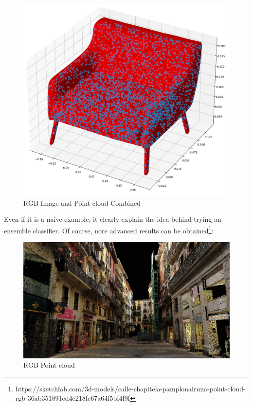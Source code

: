 \documentclass[11pt,a4paper]{article}
\begin{document}
\begin{figure}[H]
    \centering
    \includegraphics[scale=0.28]{imgs/sample-sofa-trisurf-pointcloud.jpg}
    \caption{RGB Image and Point cloud Combined}
\end{figure}
\noindent
Even if it is a naive example, it clearly explain the idea behind trying an ensemble classifier. Of course, nore advanced results can be obtained\footnote{https://sketchfab.com/3d-models/calle-chapitela-pamplonairuna-point-cloud-rgb-36ab351891ed4e218fe67a64f5bf4f9f}:
\begin{figure}[H]
    \centering
    \includegraphics[scale=0.22]{imgs/rgb-pointcloud.jpeg}
    \caption{RGB Point cloud}
\end{figure}
\noindent
\end{document}
